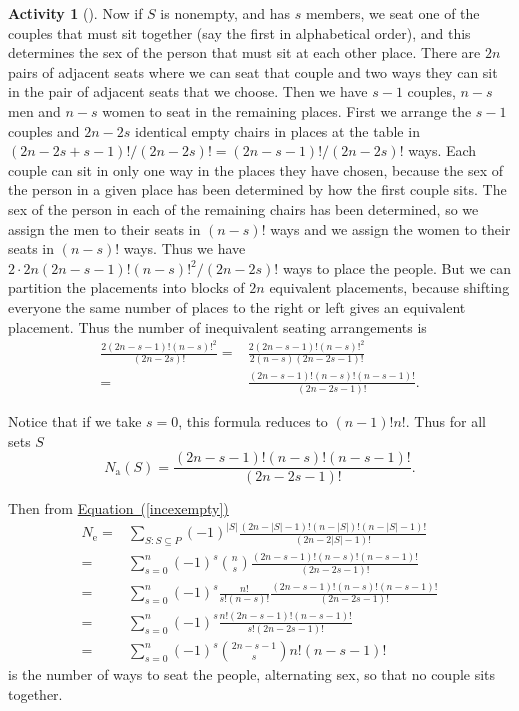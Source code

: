 \documentclass[10pt,]{book}
\theoremstyle{plain}
\theoremstyle{definition}
\newtheorem{activity}[project]{Activity}
\numberwithin{equation}{chapter}
\newcommand{\amp}{&}
\begin{document}
\begin{activity}[]
Now if \(S\) is nonempty, and has \(s\) members, we seat one of the couples that must sit together (say the first in alphabetical order), and this determines the sex of the person that must sit at each other place. There are \(2n\) pairs of adjacent seats where we can seat that couple and two ways they can sit in the pair of adjacent seats that we choose. Then we have \(s-1\) couples, \(n-s\) men and \(n-s\) women to seat in the remaining places. First we arrange the \(s-1\) couples and \(2n-2s\) identical empty chairs in places at the table in \((2n-2s+s-1)!/(2n-2s)!=(2n-s-1)!/(2n-2s)!\) ways. Each couple can sit in only one way in the places they have chosen, because the sex of the person in a given place has been determined by how the first couple sits. The sex of the person in each of the remaining chairs has been determined, so we assign the men to their seats in \((n-s)!\) ways and we assign the women to their seats in \((n-s)!\) ways. Thus we have \(2\cdot2n(2n-s-1)!(n-s)!^2/(2n-2s)!\) ways to place the people. But we can partition the placements into blocks of \(2n\) equivalent placements, because shifting everyone the same number of places to the right or left gives an equivalent placement. Thus the number of inequivalent seating arrangements is%
\begin{align*}
\frac{2(2n-s-1)!(n-s)!^2}{(2n-2s)!} =\amp \frac{2(2n-s-1)!(n-s)!^2}{2(n-s)(2n-2s-1)!}\\
=\amp \frac{(2n-s-1)!(n-s)!(n-s-1)!}{(2n-2s-1)!}.
\end{align*}
%
\par
Notice that if we take \(s=0\), this formula reduces to \((n-1)!n!\). Thus for all sets \(S\)%
\begin{equation*}
N_{\mbox{a} }(S)=\frac{(2n-s-1)!(n-s)!(n-s-1)!}{(2n-2s-1)!}.
\end{equation*}
%
\par
Then from \hyperref[incexempty]{Equation~(\ref{incexempty})}%
\begin{align*}
N_{\mbox{e} }  =\amp  \sum_{S:S\subseteq P} (-1)^{|S|}\frac{(2n-|S|-1)!(n-|S|)!(n-|S|-1)!
}{(2n-2|S|-1)!}\\
=\amp \sum_{s=0}^n(-1)^s\binom{n}{s}\frac{(2n-s-1)!(n-s)!(n-s-1)!}{(2n-2s-1)!}\\
=\amp \sum_{s=0}^n(-1)^s\frac{n!}{s!(n-s)!}\frac{(2n-s-1)!(n-s)!(n-s-1)!}{(2n-2s-1)!}\\
=\amp \sum_{s=0}^n(-1)^s \frac{n!(2n-s-1)!(n-s-1)!}{s!(2n-2s-1)!}\\
=\amp \sum_{s=0}^n(-1)^s\binom{2n-s-1}{s}n!(n-s-1)!
\end{align*}
is the number of ways to seat the people, alternating sex, so that no couple sits together.%
\end{activity}
\typeout{************************************************}
\typeout{************************************************}
\end{document}
